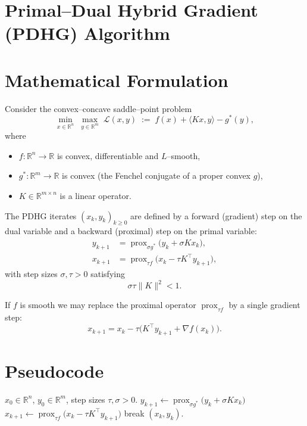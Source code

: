 \documentclass{article}
\newcommand{\prox}{\operatorname{prox}}
\begin{document}
\section*{Primal–Dual Hybrid Gradient (PDHG) Algorithm}

\section*{Mathematical Formulation}
Consider the convex–concave saddle–point problem
\[
\min_{x\in\mathbb{R}^n}\; \max_{y\in\mathbb{R}^m}
\; \mathcal{L}(x,y)\;:=\; f(x)+\langle Kx,y\rangle-g^{*}(y),
\tag{1}
\]
where  

\begin{itemize}[noitemsep]
\item $f:\mathbb{R}^{n}\to\mathbb{R}$ is convex, differentiable and $L$–smooth,
\item $g^{*}:\mathbb{R}^{m}\to\mathbb{R}$ is convex (the Fenchel conjugate of a proper convex $g$),
\item $K\in\mathbb{R}^{m\times n}$ is a linear operator.
\end{itemize}

The PDHG iterates $(x_k,y_k)_{k\ge 0}$ are defined by a forward (gradient) step on the dual variable and a backward (proximal) step on the primal variable:
\[
\boxed{
\begin{aligned}
y_{k+1}&=\prox_{\sigma g^{*}}\!\bigl(y_{k}+\sigma K x_{k}\bigr), \tag{2a}\\[4pt]
x_{k+1}&=\prox_{\tau f}\!\bigl(x_{k}-\tau K^{\!\top} y_{k+1}\bigr), \tag{2b}
\end{aligned}}
\]
with step sizes $\sigma,\tau>0$ satisfying
\[
\sigma\tau\|K\|^{2}<1 .
\tag{3}
\]

If $f$ is smooth we may replace the proximal operator $\prox_{\tau f}$ by a single gradient step:
\[
x_{k+1}=x_{k}-\tau\bigl(K^{\!\top}y_{k+1}+\nabla f(x_{k})\bigr).
\tag{4}
\]

\section*{Pseudocode}
\begin{algorithm}[H]
\caption{PDHG for \eqref{1}}
\begin{algorithmic}[1]
 $x_{0}\in\mathbb{R}^{n}$, $y_{0}\in\mathbb{R}^{m}$, step sizes $\tau,\sigma>0$.
    \STATE $y_{k+1}\gets\prox_{\sigma g^{*}}\!\bigl(y_{k}+\sigma K x_{k}\bigr)$ \hfill{}
    \STATE $x_{k+1}\gets\prox_{\tau f}\!\bigl(x_{k}-\tau K^{\!\top} y_{k+1}\bigr)$ \hfill{}
        \STATE break
    \ENDIF
\ENDFOR
{} $(x_{k},y_{k})$.
\end{algorithmic}
\end{algorithm}
\end{document}
